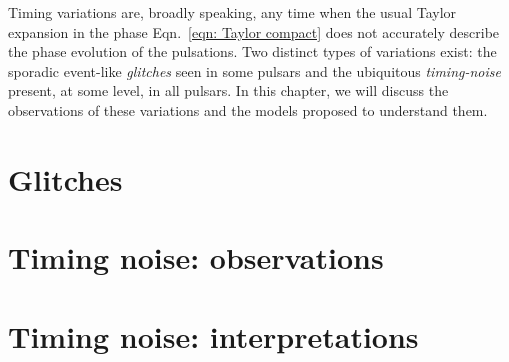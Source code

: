 \documentclass[../full_thesis/full_thesis.tex]{subfiles}
\newcommand{\thisdir}{../timing_variations}
\begin{document}
Timing variations are, broadly speaking, any time when the usual Taylor
expansion in the phase Eqn.~\eqref{eqn: Taylor compact} does not accurately
describe the phase evolution of the pulsations. Two distinct types of variations
exist: the sporadic event-like \emph{glitches} seen in some pulsars
and the ubiquitous \emph{timing-noise} present, at some level, in all pulsars.
In this chapter, we will discuss the observations of these variations and the
models proposed to understand them.

\section{Glitches}
\label{sec: glitches}


\section{Timing noise: observations}
\label{sec: timing noise observations}


\section{Timing noise: interpretations}
\label{sec: timing noise interpretations}


\biblio
\end{document}
